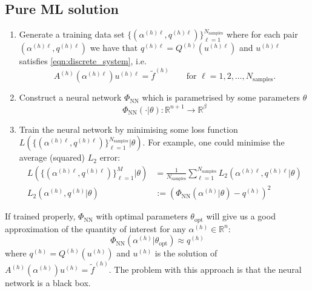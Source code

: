 \documentclass[11pt]{article}
\begin{document}
\subsection{Pure ML solution}\label{sec:pure_ml}
\begin{enumerate}
    \item Generate a training data set $\{(\alpha^{(h)\ell},q^{(h)\ell})\}_{\ell=1}^{N_{\text{samples}}}$ where for each pair $(\alpha^{(h)\ell},q^{(h)\ell})$ we have that $q^{(h)\ell}=Q^{(h)}(u^{(h)\ell})$ and $u^{(h)\ell}$ satisfies \eqref{eqn:discrete_system}, i.e. 
    \begin{equation}
        A^{(h)}(\alpha^{(h)\ell})u^{(h)\ell}=\widetilde{f}^{(h)}
        \qquad\text{for $\ell=1,2,\dots,N_{\text{samples}}$.}
    \end{equation}
    \item Construct a neural network $\Phi_{\text{NN}}$ which is parametrised by some parameters $\theta$
    \begin{equation}
        \Phi_{\text{NN}}(\cdot|\theta) : \mathbb{R}^{n+1} \rightarrow \mathbb{R}^{\beta}
    \end{equation}
    \item Train the neural network by minimising some loss function $L(\{(\alpha^{(h)\ell},q^{(h)\ell})\}_{\ell=1}^{N_{\text{samples}}}|\theta)$.
For example, one could minimise the average (squared) $L_2$ error:
\begin{equation}
    \begin{aligned}
    L(\{(\alpha^{(h)\ell},q^{(h)\ell})\}_{\ell=1}^{M}|\theta) &= \frac{1}{N_{\text{samples}}}\sum_{\ell=1}^{N_{\text{samples}}} L_2(\alpha^{(h)\ell},q^{(h)\ell}|\theta)\\
    L_2(\alpha^{(h)},q^{(h)}|\theta) &:= \left(\Phi_{\text{NN}}(\alpha^{(h)}|\theta) - q^{(h)}\right)^2
    \end{aligned}
\end{equation}
\end{enumerate}
If trained properly, $\Phi_{\text{NN}}$ with optimal parameters $\theta_{\text{opt}}$ will give us a good approximation of the quantity of interest for any $\alpha^{(h)}\in\mathbb{R}^{n}$:
\begin{equation}
    \Phi_{\text{NN}}(\alpha^{(h)}|\theta_{\text{opt}}) \approx q^{(h)}
\end{equation}
where $q^{(h)}=Q^{(h)}(u^{(h)})$ and $u^{(h)}$ is the solution of $A^{(h)}(\alpha^{(h)}) u^{(h)}=\widetilde{f}^{(h)}$.
The problem with this approach is that the neural network is a black box.
\end{document}

